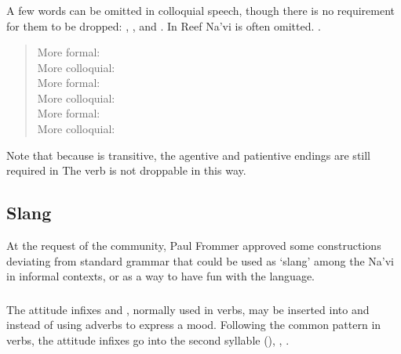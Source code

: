 \subsubsection{} \label{prag:colloq:omit}
A few words can be omitted in colloquial speech, though there is no
requirement for them to be dropped: , , and .
In Reef Na'vi  is often omitted.
.

\begin{quotation}
\noindent More formal:  \\
\noindent More colloquial:   \\

\noindent More formal:  \\
\noindent More colloquial:  \\

\noindent More formal:  \\
\noindent More colloquial:  
\end{quotation}

\noindent Note that because  is transitive, the agentive and
patientive endings are still required in 
The verb   is not droppable in this way.

\subsection{Slang} At the request of the community, Paul Frommer approved
some constructions deviating from standard grammar that could be used
as `slang' among the Na'vi in informal contexts, or as a way to have
fun with the language.

\subsubsection{}The attitude infixes  and ,
normally used in verbs, may be inserted into  
and   instead of using adverbs to express a mood.
Following the common pattern in verbs, the attitude infixes go into
the second syllable (),
, . 

